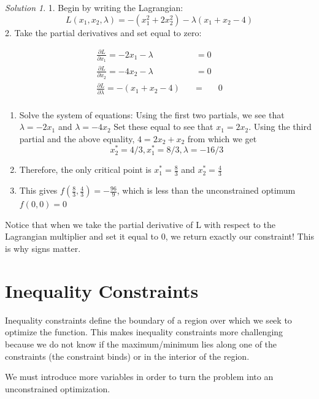 \documentclass[
]{book}
\theoremstyle{definition}
\theoremstyle{definition}
\theoremstyle{definition}
\theoremstyle{remark}
\newtheorem*{solution}{Solution}
\begin{document}
\begin{solution}
{}
1. Begin by writing the Lagrangian:
\[L(x_1, x_2, \lambda) =  -(x_1^2 + 2x_2^2) - \lambda(x_1 + x_2 - 4)\]
2. Take the partial derivatives and set equal to zero:

\begin{align*}
\frac{\partial L}{\partial x_1} = -2x_1 - \lambda \quad \quad \quad &= 0\\
\frac{\partial L}{\partial x_2}  = -4x_2 - \lambda \quad \quad \quad &= 0\\
\frac{\partial L}{\partial \lambda} = -(x_1 + x_2 - 4) \quad & = & 0\\
\end{align*}

\begin{enumerate}
\def\labelenumi{\arabic{enumi}.}
\setcounter{enumi}{2}
\item
  Solve the system of equations: Using the first two partials, we see that \(\lambda = -2x_1\) and \(\lambda = -4x_2\)
  Set these equal to see that \(x_1 = 2x_2\).
  Using the third partial and the above equality, \(4 = 2x_2 + x_2\) from which we get \[x_2^* = 4/3, x_1^* = 8/3, \lambda = -16/3\]
\item
  Therefore, the only critical point is \(x_1^* = \frac{8}{3}\) and \(x_2^* = \frac{4}{3}\)
\item
  This gives \(f(\frac{8}{3}, \frac{4}{3}) = -\frac{96}{9}\), which is less than the unconstrained optimum \(f(0,0) = 0\)
\end{enumerate}
\end{solution}

Notice that when we take the partial derivative of L with respect to the Lagrangian multiplier and set it equal to 0, we return exactly our constraint! This is why signs matter.

\hypertarget{inequality-constraints}{%
\section{Inequality Constraints}\label{inequality-constraints}}

Inequality constraints define the boundary of a region over which we seek to optimize the function. This makes inequality constraints more challenging because we do not know if the maximum/minimum lies along one of the constraints (the constraint binds) or in the interior of the region.

We must introduce more variables in order to turn the problem into an unconstrained optimization.
\end{document}
